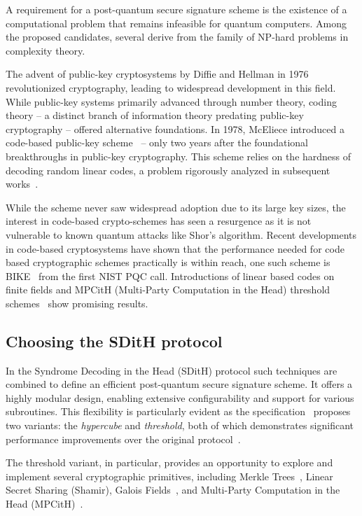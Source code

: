 \documentclass[11pt]{report}
\theoremstyle{definition}
\theoremstyle{plain}
\newcommand{\todo}[1]{{\color[rgb]{.5,0,0}\textbf{$\blacktriangleright$#1$\blacktriangleleft$}}}
\begin{document}
A requirement for a post-quantum secure signature scheme is the existence of a computational problem that remains infeasible for quantum computers. Among the proposed candidates, several derive from the family of NP-hard problems in complexity theory.

The advent of public-key cryptosystems by Diffie and Hellman in 1976 revolutionized cryptography, leading to widespread development in this field. While public-key systems primarily advanced through number theory, coding theory -- a distinct branch of information theory predating public-key cryptography -- offered alternative foundations. In 1978, McEliece introduced a code-based public-key scheme~\cite{mceliece1978public} -- only two years after the foundational breakthroughs in public-key cryptography. This scheme relies on the hardness of decoding random linear codes, a problem rigorously analyzed in subsequent works~\cite{berlekamp1978inherent}.

While the scheme never saw widespread adoption due to its large key sizes, the interest in code-based crypto-schemes has seen a resurgence as it is not vulnerable to known quantum attacks like Shor's algorithm. Recent developments in code-based cryptosystems have shown that the performance needed for code based cryptographic schemes practically is within reach, one such scheme is BIKE~\cite{BIKE_Spec_2024} from the first NIST PQC call. Introductions of linear based codes on finite fields and MPCitH (Multi-Party Computation in the Head) threshold schemes~\cite{baum2020concretely} show promising results.

\subsection{Choosing the SDitH protocol}
In the Syndrome Decoding in the Head (SDitH) protocol such techniques are combined to define an efficient post-quantum secure signature scheme. It offers a highly modular design, enabling extensive configurability and support for various subroutines. This flexibility is particularly evident as the specification~\cite{aguilarsyndrome11} proposes two variants: the \textit{hypercube} and \textit{threshold}, both of which demonstrates significant performance improvements over the original protocol~\cite{feneuil2022syndrome,aguilar2023return,feneuil2023threshold}.

The threshold variant, in particular, provides an opportunity to explore and implement several cryptographic primitives, including Merkle Trees~\cite{becker2008merkle}, Linear Secret Sharing (Shamir), Galois Fields~\cite{brownadvanced}, and Multi-Party Computation in the Head (MPCitH)~\cite{ishai2007zero,katz2018improved,baum2020concretely}. 
\end{document}
